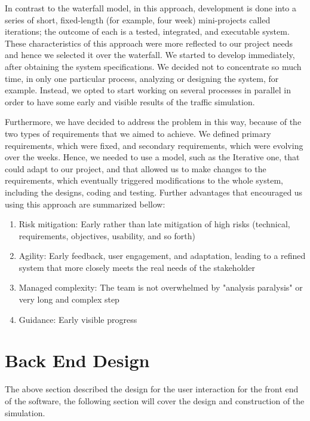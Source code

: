  In contrast to the waterfall model, in this approach, development is done into a series of short, fixed-length (for example, four week) mini-projects called iterations; the outcome of each is a tested, integrated, and executable system\cite{larm}. These characteristics of this approach were more reflected to our project needs and hence we selected it over the waterfall. We started to develop immediately, after obtaining the system specifications. We decided not to concentrate so much time, in only one particular process, analyzing or designing the system, for example. Instead, we opted to start working on several processes in parallel in order to have some early and visible results of the traffic simulation. \newline
 
\indent Furthermore, we have decided to address the problem in this way, because of the two types of requirements that we aimed to achieve. We defined primary requirements, which were fixed, and secondary requirements, which were evolving over the weeks. Hence, we needed to use a model, such as the Iterative one, that could adapt to our project, and that allowed us to make changes to the requirements, which eventually triggered modifications to the whole system, including the designs, coding and testing. Further advantages\cite{larm} that encouraged us using this approach are summarized bellow:
 
\begin{enumerate}[itemsep=1pt]
\item Risk mitigation: Early rather than late mitigation of high risks (technical, requirements, objectives, usability, and so forth)
\item Agility: Early feedback, user engagement, and adaptation, leading to a refined system that more closely meets the real needs of the stakeholder
\item Managed complexity: The team is not overwhelmed by "analysis paralysis" or very long and complex step
\item Guidance: Early visible progress
\end{enumerate}

\newpage
\section{Back End Design}

\indent The above section described the design for the user interaction for the front end of the software, the following section will cover the design and construction of the simulation. 


